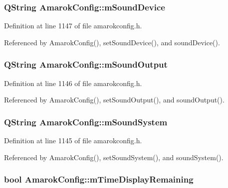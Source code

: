 \subsubsection{\setlength{\rightskip}{0pt plus 5cm}QString {\bf Amarok\-Config::m\-Sound\-Device}\hspace{0.3cm}{\tt  [protected]}}\label{classAmarokConfig_AmarokConfigp31}




Definition at line 1147 of file amarokconfig.h.

Referenced by Amarok\-Config(), set\-Sound\-Device(), and sound\-Device().
\subsubsection{\setlength{\rightskip}{0pt plus 5cm}QString {\bf Amarok\-Config::m\-Sound\-Output}\hspace{0.3cm}{\tt  [protected]}}\label{classAmarokConfig_AmarokConfigp30}




Definition at line 1146 of file amarokconfig.h.

Referenced by Amarok\-Config(), set\-Sound\-Output(), and sound\-Output().
\subsubsection{\setlength{\rightskip}{0pt plus 5cm}QString {\bf Amarok\-Config::m\-Sound\-System}\hspace{0.3cm}{\tt  [protected]}}\label{classAmarokConfig_AmarokConfigp29}




Definition at line 1145 of file amarokconfig.h.

Referenced by Amarok\-Config(), set\-Sound\-System(), and sound\-System().
\subsubsection{\setlength{\rightskip}{0pt plus 5cm}bool {\bf Amarok\-Config::m\-Time\-Display\-Remaining}\hspace{0.3cm}{\tt  [protected]}}\label{classAmarokConfig_AmarokConfigp6}




